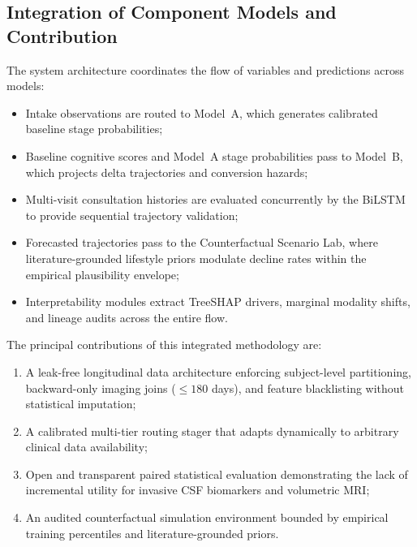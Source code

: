 \subsection{Integration of Component Models and Contribution}
The system architecture coordinates the flow of variables and predictions across models:
\begin{itemize}
    \item Intake observations are routed to Model~A, which generates calibrated baseline stage probabilities;
    \item Baseline cognitive scores and Model~A stage probabilities pass to Model~B, which projects delta trajectories and conversion hazards;
    \item Multi-visit consultation histories are evaluated concurrently by the BiLSTM to provide sequential trajectory validation;
    \item Forecasted trajectories pass to the Counterfactual Scenario Lab, where literature-grounded lifestyle priors modulate decline rates within the empirical plausibility envelope;
    \item Interpretability modules extract TreeSHAP drivers, marginal modality shifts, and lineage audits across the entire flow.
\end{itemize}

The principal contributions of this integrated methodology are:
\begin{enumerate}
    \item A leak-free longitudinal data architecture enforcing subject-level partitioning, backward-only imaging joins ($\le 180$ days), and feature blacklisting without statistical imputation;
    \item A calibrated multi-tier routing stager that adapts dynamically to arbitrary clinical data availability;
    \item Open and transparent paired statistical evaluation demonstrating the lack of incremental utility for invasive CSF biomarkers and volumetric MRI;
    \item An audited counterfactual simulation environment bounded by empirical training percentiles and literature-grounded priors.
\end{enumerate}
